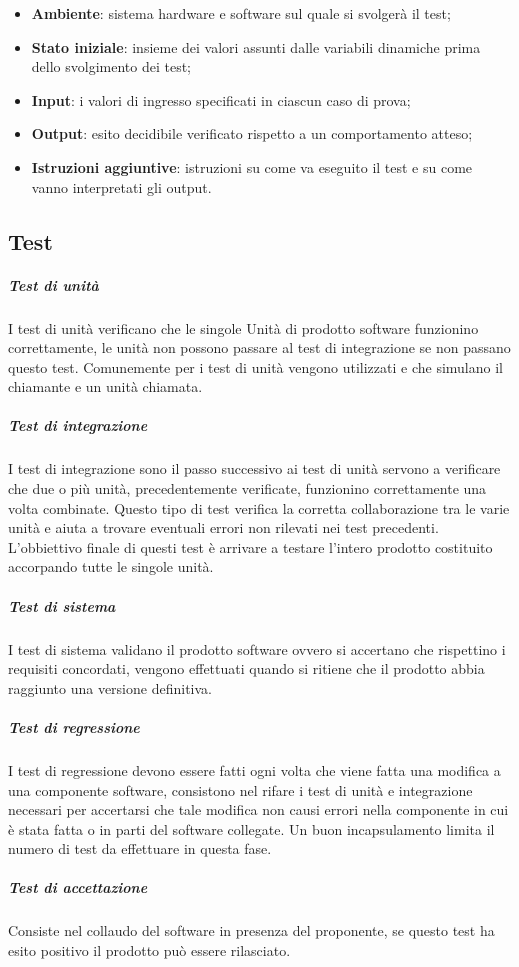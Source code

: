 \begin{itemize}
	\item \textbf{Ambiente}: sistema hardware e software sul quale si svolgerà il test;
	\item \textbf{Stato iniziale}: insieme dei valori assunti dalle variabili dinamiche prima dello svolgimento dei test;
	\item \textbf{Input}: i valori di ingresso specificati in ciascun caso di prova;
	\item \textbf{Output}: esito decidibile verificato rispetto a un comportamento atteso;
	\item \textbf{Istruzioni aggiuntive}: istruzioni su come va eseguito il test e su come vanno interpretati gli output.
\end{itemize}
\subsection{Test}
\subparagraph{Test di unità} \Spazio
I test di unità verificano che le singole Unità di prodotto software funzionino correttamente, le unità non possono passare al test di integrazione se non passano questo test.
Comunemente per i test di unità vengono utilizzati  e  che simulano il chiamante e un unità chiamata.
\subparagraph{Test di integrazione} \Spazio
I test di integrazione sono il passo successivo ai test di unità servono a verificare che due o più unità, precedentemente verificate, funzionino correttamente una volta combinate.
Questo tipo di test verifica la corretta collaborazione tra le varie unità e aiuta a trovare eventuali errori non rilevati nei test precedenti.
L'obbiettivo finale di questi test è arrivare a testare l'intero prodotto costituito accorpando tutte le singole unità.
\subparagraph{Test di sistema} \Spazio
I test di sistema validano il prodotto software ovvero si accertano che rispettino i requisiti concordati, vengono effettuati quando si ritiene che il prodotto abbia raggiunto una versione definitiva.
\subparagraph{Test di regressione}	\Spazio
I test di regressione devono essere fatti ogni volta che viene fatta una modifica a una componente software, consistono nel rifare i test di unità e integrazione necessari per accertarsi che tale modifica non causi errori nella componente in cui è stata fatta o in parti del software collegate.
Un buon incapsulamento limita il numero di test da effettuare in questa fase.
\subparagraph{Test di accettazione} \Spazio
Consiste nel collaudo del software in presenza del proponente, se questo test ha esito positivo il prodotto può essere rilasciato.
